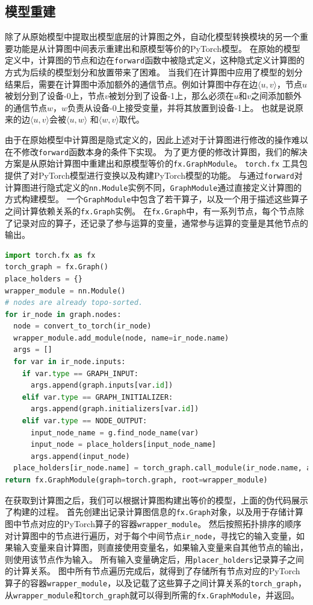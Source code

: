 \subsection{模型重建}
除了从原始模型中提取出模型底层的计算图之外，自动化模型转换模块的另一个重要功能是从计算图中间表示重建出和原模型等价的PyTorch模型。
在原始的模型定义中，计算图的节点和边在\texttt{forward}函数中被隐式定义，这种隐式定义计算图的方式为后续的模型划分和放置带来了困难。
当我们在计算图中应用了模型的划分结果后，需要在计算图中添加额外的通信节点。例如计算图中存在边$\langle u,v\rangle$，节点$u$被划分到了设备-0上，节点$v$被划分到了设备-1上，那么必须在$u$和$v$之间添加额外的通信节点$w$，$w$负责从设备-0上接受变量，并将其放置到设备-1上。
也就是说原来的边$\langle u,v\rangle$会被$\langle u, w\rangle$ 和$\langle w,v\rangle$取代。

由于在原始模型中计算图是隐式定义的，因此上述对于计算图进行修改的操作难以在不修改\texttt{forward}函数本身的条件下实现。
为了更方便的修改计算图，我们的解决方案是从原始计算图中重建出和原模型等价的\texttt{fx.GraphModule}。
\texttt{torch.fx}  工具包提供了对PyTorch模型进行变换以及构建PyTorch模型的功能。
与通过\texttt{forward}对计算图进行隐式定义的\texttt{nn.Module}实例不同，\texttt{GraphModule}通过直接定义计算图的方式构建模型。
一个\texttt{GraphModule}中包含了若干算子，以及一个用于描述这些算子之间计算依赖关系的\texttt{fx.Graph}实例。
在\texttt{fx.Graph}中，有一系列节点，每个节点除了记录对应的算子，还记录了参与运算的变量，通常参与运算的变量是其他节点的输出。

\begin{lstlisting}[language=Python, caption={模型重建}]
import torch.fx as fx 
torch_graph = fx.Graph() 
place_holders = {}
wrapper_module = nn.Module()
# nodes are already topo-sorted.
for ir_node in graph.nodes:
  node = convert_to_torch(ir_node)
  wrapper_module.add_module(node, name=ir_node.name)
  args = []
  for var in ir_node.inputs:
    if var.type == GRAPH_INPUT:
	  args.append(graph.inputs[var.id])
	elif var.type == GRAPH_INITIALIZER:
      args.append(graph.initializers[var.id])
	elif var.type == NODE_OUTPUT:
	  input_node_name = g.find_node_name(var)
	  input_node = place_holders[input_node_name]
	  args.append(input_node)
  place_holders[ir_node.name] = torch_graph.call_module(ir_node.name, args)
return fx.GraphModule(graph=torch.graph, root=wrapper_module)
\end{lstlisting}

在获取到计算图之后，我们可以根据计算图构建出等价的模型，上面的伪代码展示了构建的过程。
首先创建出记录计算图信息的\texttt{fx.Graph}对象，以及用于存储计算图中节点对应的PyTorch算子的容器\texttt{wrapper\_module}。
然后按照拓扑排序的顺序对计算图中的节点进行遍历，对于每个中间节点\texttt{ir\_node}，寻找它的输入变量，如果输入变量来自计算图，则直接使用变量名，如果输入变量来自其他节点的输出，则使用该节点作为输入。
所有输入变量确定后，用\texttt{placer\_holders}记录算子之间的计算关系。
图中所有节点遍历完成后，就得到了存储所有节点对应的PyTorch算子的容器\texttt{wrapper\_module}，以及记载了这些算子之间计算关系的\texttt{torch\_graph}，从\texttt{wrapper\_module}和\texttt{torch\_graph}就可以得到所需的\texttt{fx.GraphModule}，并返回。

